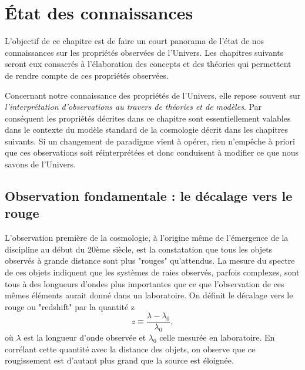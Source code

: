 \chapter{État des connaissances}


L'objectif de ce chapitre est de faire un court panorama de l'état de nos connaissances sur les propriétés observées de l'Univers. Les chapitres suivants seront eux consacrés à l'élaboration des concepts et des théories qui permettent de rendre compte de ces propriétés observées. 

Concernant notre connaissance des propriétés de l'Univers, elle repose souvent sur \textit{l'interprétation d'observations au travers de théories et de modèles}. Par conséquent les propriétés décrites dans ce chapitre sont essentiellement valables dans le contexte du modèle standard de la cosmologie décrit dans les chapitres suivants. Si un changement de paradigme vient à opérer, rien n'empêche à priori que ces observations soit réinterprétées et donc conduisent à modifier ce que nous savons de l'Univers.

\section{Observation fondamentale : le décalage vers le rouge}
L'observation première de la cosmologie, à l'origine même de l'émergence de la discipline au début du 20ème siècle, est la constatation que tous les objets observés à grande distance sont plus "rouges" qu'attendus. La mesure du spectre de ces objets indiquent que les systèmes de raies observés, parfois complexes, sont tous à des longueurs d'ondes plus importantes que ce que l'observation de ces mêmes éléments aurait donné dans un laboratoire. On définit le décalage vers le rouge ou "redshift" par la quantité z
\begin{equation}
z\equiv\frac{\lambda-\lambda_0}{\lambda_0},
\end{equation}
où $\lambda$ est la longueur d'onde observée et $\lambda_0$ celle mesurée en laboratoire. En corrélant cette quantité avec la distance des objets, on observe que ce rougissement est d'autant plus grand que la source est éloignée. 

